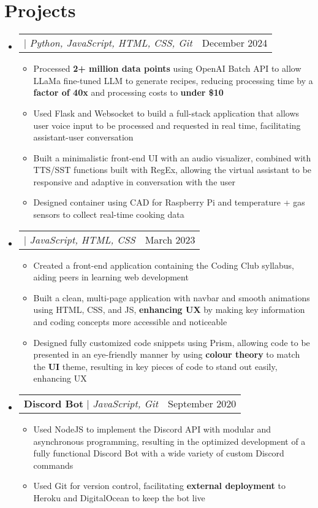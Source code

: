 \documentclass[letterpaper,11pt]{article}
\makeatletter
\newcommand{\resumeItem}[1]{
  \item\small{
    {#1 \vspace{0pt}}
  }
}
\newcommand{\resumeProjectHeading}[2]{
    \item
    \begin{tabular*}{0.97\textwidth}{l@{\extracolsep{\fill}}r}
      \small#1 & #2 \\
    \end{tabular*}\vspace{-7pt}
}
\newcommand{\resumeSubHeadingListStart}{\begin{itemize}[leftmargin=0.15in, label={}]}
\newcommand{\resumeSubHeadingListEnd}{\end{itemize}}
\newcommand{\resumeItemListStart}{\begin{itemize}}
\newcommand{\resumeItemListEnd}{\end{itemize}\vspace{-8pt}}
\makeatother
\begin{document}
\section{Projects}
  \resumeSubHeadingListStart
    \resumeProjectHeading
        {\textbf{\href{https://youtu.be/q-WvIjfFc7Q?si=JN_DYJyrR8w8-lbQ}{\underbar{AI Cooking Assistant}}} $|$ \emph{Python, JavaScript, HTML, CSS, Git}}{December 2024}
        \resumeItemListStart
          \resumeItem{Processed \textbf{2+ million data points} using OpenAI Batch API to allow LLaMa fine-tuned LLM to generate recipes, reducing processing time by a \textbf{factor of 40x} and processing costs to \textbf{under \$10}}
          \resumeItem{Used Flask and Websocket to build a full-stack application that allows user voice input to be processed and requested in real time, facilitating assistant-user conversation}
          \resumeItem{Built a minimalistic front-end UI with an audio visualizer, combined with TTS/SST functions built with RegEx, allowing the virtual assistant to be responsive and adaptive in conversation with the user}
          \resumeItem{Designed container using CAD for Raspberry Pi and temperature + gas sensors to collect real-time cooking data}
        \resumeItemListEnd
        \vspace{-2pt}
    \resumeProjectHeading
        {\textbf{\href{https://garfieldfluffjr.github.io/Parkdale-WebDev-Club/}{\underbar{Coding Club Website}}} $|$ \emph{JavaScript, HTML, CSS}}{March 2023}
        \resumeItemListStart
          \resumeItem{Created a front-end application containing the Coding Club syllabus, aiding peers in learning web development}
          \resumeItem{Built a clean, multi-page application with navbar and smooth animations using HTML, CSS, and JS, \textbf{enhancing UX} by making key information and coding concepts more accessible and noticeable}
          \resumeItem{Designed fully customized code snippets using Prism, allowing code to be presented in an eye-friendly manner by using \textbf{colour theory} to match the \textbf{UI} theme, resulting in key pieces of code to stand out easily, enhancing UX}
        \resumeItemListEnd
        \vspace{-2pt}
    \resumeProjectHeading
      {\textbf{Discord Bot} $|$ \emph{JavaScript, Git}}{September 2020}
      \resumeItemListStart
        \resumeItem{Used NodeJS to implement the Discord API with modular and asynchronous programming, resulting in the optimized development of a fully functional Discord Bot with a wide variety of custom Discord commands}
        \resumeItem{Used Git for version control, facilitating \textbf{external deployment} to Heroku and DigitalOcean to keep the bot live}
      \resumeItemListEnd
  \resumeSubHeadingListEnd
\end{document}
